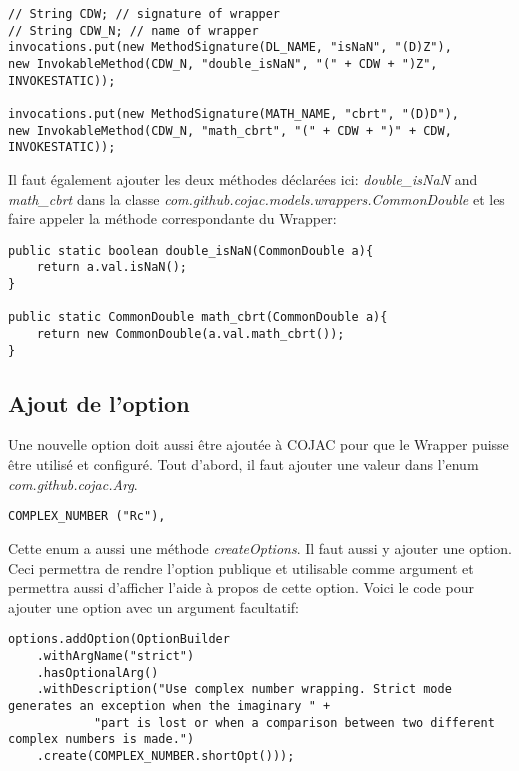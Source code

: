 \begin{verbatim}
// String CDW; // signature of wrapper
// String CDW_N; // name of wrapper
invocations.put(new MethodSignature(DL_NAME, "isNaN", "(D)Z"),
new InvokableMethod(CDW_N, "double_isNaN", "(" + CDW + ")Z", INVOKESTATIC));

invocations.put(new MethodSignature(MATH_NAME, "cbrt", "(D)D"),
new InvokableMethod(CDW_N, "math_cbrt", "(" + CDW + ")" + CDW, INVOKESTATIC));
\end{verbatim}

Il faut également ajouter les deux méthodes déclarées ici: \textit{double\_isNaN} and \textit{math\_cbrt} dans la classe \textit{com.github.cojac.models.wrappers.CommonDouble} et les faire appeler la méthode correspondante du \gls{Wrapper}:

\begin{verbatim}
public static boolean double_isNaN(CommonDouble a){
    return a.val.isNaN();
}

public static CommonDouble math_cbrt(CommonDouble a){
    return new CommonDouble(a.val.math_cbrt());
}
\end{verbatim}

\subsection{Ajout de l'option}
\label{sec:complex_implementation_option}

Une nouvelle option doit aussi être ajoutée à \gls{COJAC} pour que le \gls{Wrapper} puisse être utilisé et configuré. Tout d'abord, il faut ajouter une valeur dans l'enum \textit{com.github.cojac.Arg}.

\begin{verbatim}
COMPLEX_NUMBER ("Rc"),
\end{verbatim}

Cette enum a aussi une méthode \textit{createOptions}. Il faut aussi y ajouter une option. Ceci permettra de rendre l'option publique et utilisable comme argument et permettra aussi d'afficher l'aide à propos de cette option. Voici le code pour ajouter une option avec un argument facultatif:

\begin{verbatim}
options.addOption(OptionBuilder
    .withArgName("strict")
    .hasOptionalArg()
    .withDescription("Use complex number wrapping. Strict mode generates an exception when the imaginary " +
            "part is lost or when a comparison between two different complex numbers is made.")
    .create(COMPLEX_NUMBER.shortOpt()));
\end{verbatim}

